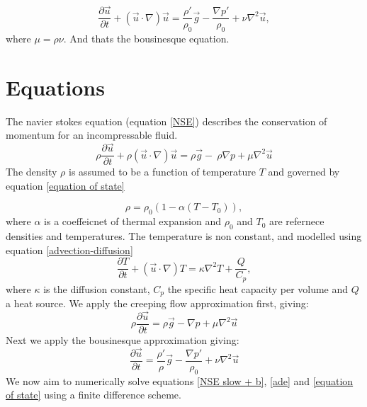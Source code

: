 \documentclass{article}
\begin{document}
\begin{equation}
	\frac{\partial \vec{u}}{\partial t} + (\vec{u} \cdot \nabla) \vec{u} =  \frac{\rho'}{\rho_0}\vec{g} - \frac{\nabla p'}{\rho_0} + \nu \nabla^2 \vec{u},
	\label{b equation 2}
\end{equation}
where $\mu = \rho \nu$. 
\newline
And thats the bousinesque equation.

\section*{Equations}
The navier stokes equation (equation \ref{NSE}) describes the conservation of momentum for an incompressable fluid.
\begin{equation}
	\rho \frac{\partial \vec{u}}{\partial t} + \rho (\vec{u} \cdot \nabla) \vec{u} = \rho \vec{g} - \ \rho {\nabla p} + \mu \nabla^2 \vec{u}
	\label{NSE}
\end{equation}
The density $\rho$ is assumed to be a function of temperature $T$ and governed by equation \ref{equation of state}

\begin{equation}
	\rho = \rho_0 (1- \alpha (T - T_0)),
	\label{equation of state}
\end{equation}
where $\alpha$ is a coeffeicnet of thermal expansion and $\rho_0$ and $T_0$ are refernece densities and temperatures. The temperature is non constant, and modelled using equation \ref{advection-diffusion}
\begin{equation}
	\frac{\partial T}{\partial t} + (\vec{u} \cdot \nabla) T = \kappa \nabla^2 T + \frac{Q}{C_p},
	\label{ade}
\end{equation}
where $\kappa$ is the diffusion constant, $C_p$ the specific heat capacity per volume and $Q$ a heat source.
\newline
We apply the creeping flow approximation first, giving:
\begin{equation}
	\rho \frac{\partial \vec{u}}{\partial t} = \rho \vec{g} - {\nabla p} + \mu \nabla^2 \vec{u}
	\label{NSE slow}
\end{equation}
Next we apply the bousinesque approximation giving:
\begin{equation}
	\frac{\partial \vec{u}}{\partial t} = \frac{\rho'}{\rho} \vec{g} -   \frac{\nabla p'}{\rho_0} + \nu \nabla^2 \vec{u}
	\label{NSE slow + b}
\end{equation}
We now aim to numerically solve equations \ref{NSE slow + b}, \ref{ade} and \ref{equation of state} using a finite difference scheme.
\end{document}
